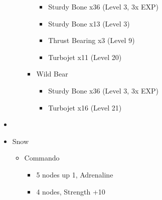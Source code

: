 \begin{multicols}{2}
\begin{upgrade}
\begin{itemize}
\begin{itemize}
\begin{itemize}
            \begin{itemize}
                \item Sturdy Bone x36 (Level 3, 3x EXP)
                \item Sturdy Bone x13 (Level 3)
                \item Thrust Bearing x3 (Level 9)
                \item Turbojet x11 (Level 20)
            \end{itemize}
            \item Wild Bear
            \begin{itemize}
                \item Sturdy Bone x36 (Level 3, 3x EXP)
                \item Turbojet x16 (Level 21)
            \end{itemize}
        \end{itemize}
    \end{itemize}
\end{itemize}
\end{upgrade}
\vfill
\begin{menu}
\begin{itemize}
    \paradigm
    \begin{itemize}
        \item {}%
{\paradigmline[1]{\textit{\com}}{\textit{\rav}}{}}%
{\paradigmline{\com}{\med}{}}%
{\paradigmline{\sen}{\med}{}}%
{\paradigmline{\sen}{\syn}{}}%
{\paradigmline{[\rav]}{\rav}{}}%
{\paradigmline{[\rav]}{\rav}{}}
    \end{itemize}
    \crystarium
    \begin{itemize}
        \item Snow
        \begin{itemize}
            \item Commando
            \begin{itemize}
                \item 5 nodes up 1, Adrenaline
                \item 4 nodes, Strength +10
            \end{itemize}
        \end{itemize}
    \end{itemize}
\end{itemize}
\end{menu}
\renewcommand{\first}{[1] Slash \& Burn (\com/\rav)}
\renewcommand{\second}{[2] War \& Peace (\com/\med)}
\renewcommand{\fifth}{[5] Dualcasting (\rav/\rav)}

\end{multicols}
